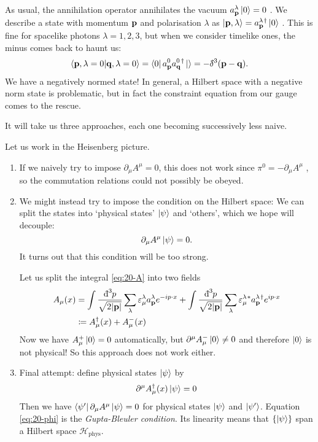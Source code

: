 As usual, the annihilation operator annihilates the vacuum $a_{\vb{p}}^{\lambda} \ket{0} = 0$ .
We describe a state with momentum $\vb{p}$  and polarisation $\lambda$ as  $\ket{\vb{p}, \lambda} = a_{\vb{p}}^{\lambda}{}^{\dagger} \ket{0}$ . This is fine for spacelike photons $\lambda = 1, 2, 3$, but when we consider timelike ones, the minus comes back to haunt us:
 \begin{equation}
  \bra{\vb{p}, \lambda = 0}\ket{\vb{q}, \lambda = 0} = \bra{0} a_{\vb{p}}^0 a_{\vb{q}}^0{}^{\dagger} \ket{} = - \bdelta^3(\vb{p} - \vb{q}).
\end{equation}
We have a negatively normed state!  
In general, a Hilbert space with a negative norm state is problematic, but in fact the constraint equation from our gauge comes to the rescue.

It will take us three approaches, each one becoming successively less naive.

Let us work in the Heisenberg picture.
\begin{enumerate}[]
  \item If we naively try to impose $\partial_{\mu} A^{\mu} = 0$, this does not work since $\pi^0 = -\partial_{\mu} A^{\mu}$ , so the commutation relations could not possibly be obeyed.
  \item We might instead try to impose the condition on the Hilbert space:
    We can split the states into `physical states' $\ket{\psi}$  and `others', which we hope will decouple:
    \begin{equation}
      \label{eq:20-star}
      \partial_{\mu} A^{\mu} \ket{\psi} = 0.
    \end{equation}
    It turns out that this condition will be too strong.

    Let us split the integral \eqref{eq:20-A} into two fields
    \begin{align}
      A_{\mu}({x}) &= \int \frac{\bdd[3]{p}}{ \sqrt{2 \abs{\vb{p}}}} \sum_{\lambda} \varepsilon_{\mu}^{\lambda} a_{\vb{p}} ^{\lambda} e^{-i {p} \cdot {x}}
      + \int \frac{\bdd[3]{p}}{\sqrt{2 \abs{\vb{p}}}} \sum_\lambda \varepsilon_{\mu}^{\lambda}{}^* a_{\vb{p}}^{\lambda}{}^{\dagger} e^{i {p} \cdot {x}} \\
		      &\coloneqq A_{\mu}^{\dagger}(x) + A_{\mu}^- (x)
    \end{align}
    Now we have $A_{\mu}^+ \ket{0} = 0$ automatically, but $\partial^{\mu} A_{\mu}^- \ket{0} \neq 0$ and therefore $\ket{0}$ is not physical!
    So this approach does not work either.

  \item Final attempt: define physical states $\ket{\psi}$ by 
    \begin{equation}
      \label{eq:20-phi}
      \partial^{\mu} A^{\dagger}_{\mu} (x) \ket{\psi} = 0
    \end{equation}
    Then we have $\bra{\psi'} \partial_{\mu} A^{\mu} \ket{\psi} = 0$ for physical states $\ket{\psi}$ and $\ket{\psi'}$. 
    Equation \eqref{eq:20-phi} is the \emph{Gupta-Bleuler condition}. Its linearity means that $\left\{ \ket{\psi} \right\}$ span a Hilbert space $\mathcal{H}_{\text{phys}}$.
\end{enumerate}

